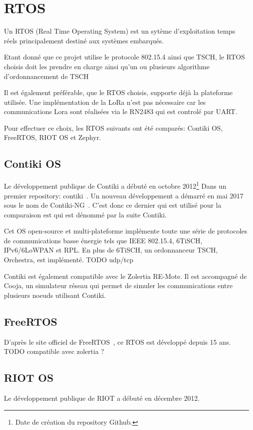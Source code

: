 \section{RTOS}

Un RTOS (Real Time Operating System) est un sytème d'exploitation temps réels principalement destiné aux systèmes embarqués.

Etant donné que ce projet utilise le protocole 802.15.4 ainsi que TSCH, le RTOS choisis doit les prendre en charge ainsi qu'un ou plusieurs algorithme d'ordonnancement de TSCH

Il est également préférable, que le RTOS choisis, supporte déjà la plateforme utilisée. Une implémentation de la LoRa n'est pas nécessaire car les communications Lora sont réalisées via le RN2483 qui est controlé par UART.

Pour effectuer ce choix, les RTOS suivants ont été comparés: Contiki OS, FreeRTOS, RIOT OS et Zephyr.

\subsection*{Contiki OS}
    Le développement publique de Contiki a débuté en octobre 2012\footnote{Date de création du repository Github.} Dans un premier repository: contiki~\cite{contiki-repo:old}. Un nouveau développement a démarré en mai 2017 sous le nom de Contiki-NG~\cite{contiki-repo:ng}. C'est donc ce dernier qui est utilisé pour la comparaison est qui est dénommé par la suite Contiki.

    Cet OS open-source et multi-plateforme implémente toute une série de protocoles de communications basse énergie tels que IEEE 802.15.4, 6TiSCH, IPv6/6LoWPAN et RPL. En plus de 6TiSCH, un ordonnanceur TSCH, Orchestra, est implémenté.
    TODO udp/tcp

    Contiki est également compatible avec le Zolertia RE-Mote. Il est accompagné de Cooja, un simulateur réseau qui permet de simuler les communications entre plusieurs noeuds utilisant Contiki.

\subsection*{FreeRTOS}
    D'après le site officiel de FreeRTOS~\cite{freertos}, ce RTOS est développé depuis 15 ans.
    TODO compatible avec zolertia ?

\subsection*{RIOT OS}
    Le développement publique de RIOT a débuté en décembre 2012\footnotemark[1].
    
